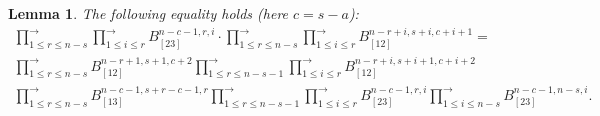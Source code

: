 \documentclass[11pt, reqno]{amsart}
\newtheorem{lemma}[theorem]{Lemma}
\theoremstyle{definition}
\numberwithin{equation}{section}
\def\longra{\longrightarrow}
\def\le{\leqslant}
\begin{document}
\begin{lemma}
\label{lem:step}
The following equality holds (here $c=s-a$):
\begin{multline*}
\prod_{1 \le r \le n-s}^{\longra} \prod_{1 \le i \le r}^{\longra} B_{[23]}^{n-c-1,r,i} \cdot \prod_{1 \le r \le n-s}^{\longra} \prod_{1 \le i \le r}^{\longra} B_{[12]}^{n-r+i,s+i,c+i+1} = \\
\prod_{1 \le r \le n-s}^{\longra} B_{[12]}^{n-r+1,s+1,c+2} \prod_{1 \le r \le n-s-1}^{\longra} \prod_{1 \le i \le r}^{\longra} B_{[12]}^{n-r+i,s+i+1,c+i+2}\\
\prod_{1 \le r \le n-s}^{\longra} B_{[13]}^{n-c-1,s+r-c-1,r} \prod_{1 \le r \le n-s-1}^{\longra} \prod_{1 \le i \le r}^{\longra} B_{[23]}^{n-c-1,r,i} \prod_{1 \le i \le n-s}^{\longra}B_{[23]}^{n-c-1,n-s,i}.
\end{multline*}
\end{lemma}
\end{document}

